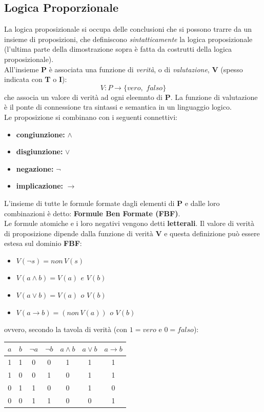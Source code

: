 \documentclass[a4paper,12pt, oneside]{book}
\begin{document}
\subsection{Logica Proporzionale}
La logica proposizionale si occupa delle conclusioni che si possono trarre da un insieme di proposizioni, che definiscono \textit{sintatticamente} la logica proposizionale (l'ultima parte della dimostrazione sopra è fatta da costrutti della logica proposizionale).\\
All'insieme \textbf{P} è associata una funzione di \textit{verità}, o di \textit{valutazione}, \textbf{V} (spesso indicata con \textbf{T} o \textbf{I}):
$$V:P\to\{vero,\,\,falso\}$$
che associa un valore di verità ad ogni eleemnto di \textbf{P}. La funzione di valutazione è il ponte di connessione tra sintassi e semantica in un linguaggio logico.\\
Le proposizione si combinano con i seguenti connettivi:
\begin{itemize}
	\item \textbf{congiunzione:} $\wedge$
	\item \textbf{disgiunzione:} $\vee$
	\item \textbf{negazione:} $\neg$
	\item \textbf{implicazione:} $\to$
\end{itemize}
L'insieme di tutte le formule formate dagli elementi di \textbf{P} e dalle loro combinazioni è detto: \textbf{Formule Ben Formate (FBF)}.\\
Le formule atomiche e i loro negativi vengono detti \textbf{letterali}. Il valore di verità di proposizione dipende dalla funzione di verità \textbf{V} e questa definizione può essere estesa sul dominio \textbf{FBF}:
\begin{itemize}
	\item $V(\neg s)=non\,V(s)$
	\item $V(a\wedge b)=V(a)\,\ e\,\, V(b)$
	\item $V(a\vee b)=V(a)\,\ o\,\, V(b)$
	\item $V(a\to b)=(non\,V(a))\,\ o\,\, V(b)$
\end{itemize}
ovvero, secondo la tavola di verità (con $1=vero$ e $0=falso$):
\begin{center}
	\begin{tabular}{|c|c|c|c|c|c|c|}
		\hline
		$a$ & $b$ & $\neg a$ & $\neg b$ & $a\wedge b$ & $a\vee b$ & $a\to b$ \\
		\hline
		1   & 1   & 0        & 0        & 1           & 1         & 1        \\
		\hline
		1   & 0   & 0        & 1        & 0           & 1         & 1        \\
		\hline
		0   & 1   & 1        & 0        & 0           & 1         & 0        \\
		\hline
		0   & 0   & 1        & 1        & 0           & 0         & 1        \\
		\hline
	\end{tabular}
\end{center}
\end{document}
